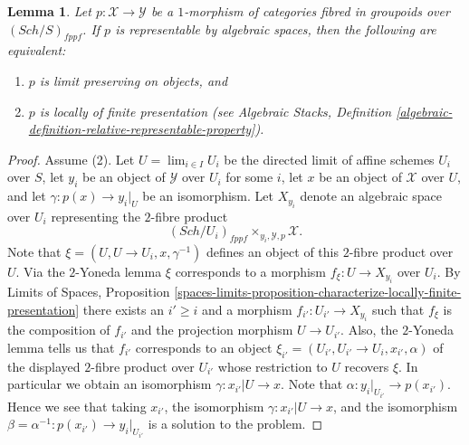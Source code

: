 \documentclass{stacks-project}
\theoremstyle{plain}
\newtheorem{lemma}[subsection]{Lemma}
\theoremstyle{definition}
\theoremstyle{remark}
\numberwithin{equation}{subsection}
\def\lim{\mathop{\mathrm{lim}}\nolimits}
\def\Sch{\mathit{Sch}}
\begin{document}
\begin{lemma}
\label{lemma-representable-by-spaces-limit-preserving}
Let $p : \mathcal{X} \to \mathcal{Y}$ be a $1$-morphism of categories
fibred in groupoids over $(\Sch/S)_{fppf}$. If $p$ is
representable by algebraic spaces, then the following are equivalent:
\begin{enumerate}
\item $p$ is limit preserving on objects, and
\item $p$ is locally of finite presentation (see
Algebraic Stacks,
Definition \ref{algebraic-definition-relative-representable-property}).
\end{enumerate}
\end{lemma}

\begin{proof}
Assume (2). Let $U = \lim_{i \in I} U_i$ be the directed limit
of affine schemes $U_i$ over $S$, let $y_i$ be an object of $\mathcal{Y}$
over $U_i$ for some $i$, let $x$ be an object of $\mathcal{X}$ over $U$,
and let $\gamma : p(x) \to y_i|_U$ be an isomorphism. Let
$X_{y_i}$ denote an algebraic space over $U_i$ representing the $2$-fibre
product
$$
(\Sch/U_i)_{fppf} \times_{y_i, \mathcal{Y}, p} \mathcal{X}.
$$
Note that $\xi = (U, U \to U_i, x, \gamma^{-1})$ defines an object of
this $2$-fibre product over $U$. Via the $2$-Yoneda lemma $\xi$ corresponds
to a morphism $f_\xi : U \to X_{y_i}$ over $U_i$. By
Limits of Spaces, Proposition
\ref{spaces-limits-proposition-characterize-locally-finite-presentation}
there exists an $i' \geq i$ and a morphism $f_{i'} : U_{i'} \to X_{y_i}$
such that $f_\xi$ is the composition of $f_{i'}$ and the projection
morphism $U \to U_{i'}$. Also, the $2$-Yoneda lemma tells us that
$f_{i'}$ corresponds to an object
$\xi_{i'} = (U_{i'}, U_{i'} \to U_i, x_{i'}, \alpha)$ of
the displayed $2$-fibre product over $U_{i'}$ whose restriction to
$U$ recovers $\xi$. In particular we obtain an isomorphism
$\gamma : x_{i'}|U \to x$. Note that $\alpha : y_i|_{U_{i'}} \to p(x_{i'})$.
Hence we see that taking $x_{i'}$, the isomorphism
$\gamma : x_{i'}|U \to x$, and the isomorphism
$\beta = \alpha^{-1} : p(x_{i'}) \to y_i|_{U_{i'}}$
is a solution to the problem.


\end{proof}
\end{document}
